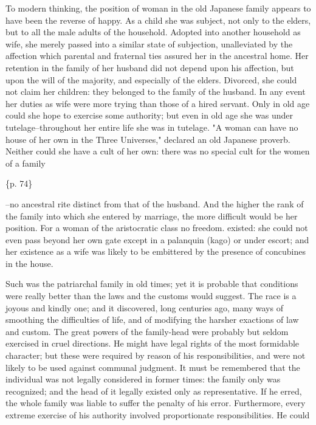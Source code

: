 To modern thinking, the position of woman in the old Japanese family appears to have been the reverse of happy. As a child she was subject, not only to the elders, but to all the male adults of the household. Adopted into another household as wife, she merely passed into a similar state of subjection, unalleviated by the affection which parental and fraternal ties assured her in the ancestral home. Her retention in the family of her husband did not depend upon his affection, but upon the will of the majority, and especially of the elders. Divorced, she could not claim her children: they belonged to the family of the husband. In any event her duties as wife were more trying than those of a hired servant. Only in old age could she hope to exercise some authority; but even in old age she was under tutelage--throughout her entire life she was in tutelage. "A woman can have no house of her own in the Three Universes," declared an old Japanese proverb. Neither could she have a cult of her own: there was no special cult for the women of a family

\{p. 74\}

--no ancestral rite distinct from that of the husband. And the higher the rank of the family into which she entered by marriage, the more difficult would be her position. For a woman of the aristocratic class no freedom. existed: she could not even pass beyond her own gate except in a palanquin (kago) or under escort; and her existence as a wife was likely to be embittered by the presence of concubines in the house.



Such was the patriarchal family in old times; yet it is probable that conditions were really better than the laws and the customs would suggest. The race is a joyous and kindly one; and it discovered, long centuries ago, many ways of smoothing the difficulties of life, and of modifying the harsher exactions of law and custom. The great powers of the family-head were probably but seldom exercised in cruel directions. He might have legal rights of the most formidable character; but these were required by reason of his responsibilities, and were not likely to be used against communal judgment. It must be remembered that the individual was not legally considered in former times: the family only was recognized; and the head of it legally existed only as representative. If he erred, the whole family was liable to suffer the penalty of his error. Furthermore, every extreme exercise of his authority involved proportionate responsibilities. He could

